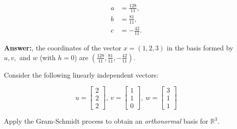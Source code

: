\documentclass{exam}
\begin{document}
\begin{questions}
\begin{parts}
\begin{solution}
\begin{align*}
a &= \frac{128}{11}, \\
b &= \frac{81}{11}, \\
c &= -\frac{42}{11}.
\end{align*}

\textbf{Answer:}, the coordinates of the vector \( x = (1, 2, 3) \) in the basis formed by \( u, v, \) and \( w \) (with \( h = 0 \)) are \( \left( \frac{128}{11}, \frac{81}{11}, -\frac{42}{11} \right) \).


\end{solution}
\end{parts}



\question[3]
Consider the following linearly independent vectors:

$$u = \left[\begin{array}{c} 2 \\ 2 \\ 2 \end{array}\right], \ 
v = \left[\begin{array}{c} 1 \\ 1 \\ 0 \end{array}\right], \ 
w = \left[\begin{array}{c} 3 \\ 1 \\ 1 \end{array}\right]$$

\vspace{0.25cm}
\noindent
Apply the Gram-Schmidt process to obtain an \textit{orthonormal} basis for $\mathbb{R}^3$.

\begin{solution}





\end{solution}
\end{questions}
\end{document}
